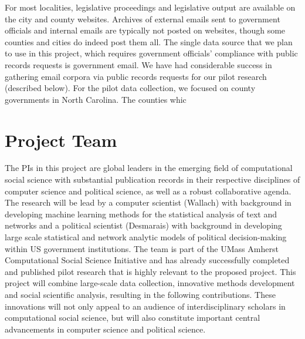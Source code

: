 For most localities, legislative proceedings and legislative output are available on the city and county websites. Archives of external emails sent to government officials and internal emails are typically not posted on websites, though some counties and cities do indeed post them all. The single data source that we plan to use in this project, which requires government officials' compliance with public records requests is government email. We have had considerable success in gathering email corpora via public records requests for our pilot research (described below). For the pilot data collection, we focused on county governments in North Carolina. The counties whic


\section{Project Team}

The PIs in this project are global leaders in the emerging field of computational social science with substantial publication records in their respective disciplines of computer science and political science, as well as a robust collaborative agenda. The research will be lead by a computer scientist (Wallach) with background in developing machine learning methods for the statistical analysis of text and networks and a political scientist (Desmarais) with background in developing large scale statistical and network analytic models of political decision-making within US government institutions. The team is part of the UMass Amherst Computational Social Science Initiative and has already successfully completed and published pilot research that is highly relevant to the proposed project. This project will combine large-scale data collection, innovative methods development and social scientific analysis, resulting in the following contributions. These innovations will not only appeal to an audience of interdisciplinary scholars in computational social science, but will also constitute important central advancements in computer science and political science.

